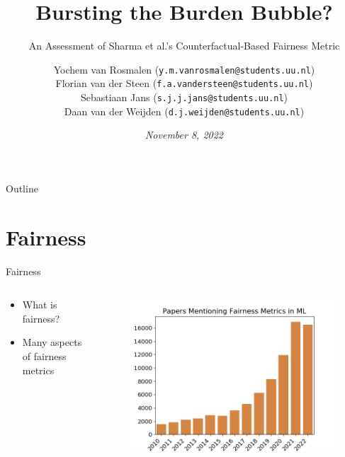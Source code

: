 \documentclass[handout,aspectratio=169]{beamer}
\title{Bursting the Burden Bubble?}
\subtitle{An Assessment of Sharma et al.'s Counterfactual-Based Fairness Metric}
\date{\textit{November 8, 2022}}
\author{%
Yochem van Rosmalen {\scriptsize(\texttt{y.m.vanrosmalen@students.uu.nl})}\\
Florian van der Steen {\scriptsize(\texttt{f.a.vandersteen@students.uu.nl})}\\
Sebastiaan Jans {\scriptsize(\texttt{s.j.j.jans@students.uu.nl})}\\
Daan van der Weijden {\scriptsize(\texttt{d.j.weijden@students.uu.nl})}
}
\institute{Utrecht University, The Netherlands}
\begin{document}
\maketitle

\begin{frame}{Outline}
    \tableofcontents
\end{frame}

\section{Fairness}

\begin{frame}{Fairness}
    \begin{columns}
        \begin{column}{0.5\textwidth}
            \begin{itemize}
            \item What is fairness?
            \item Many aspects of fairness \pause \alert{metrics}
            \end{itemize}
        \end{column}
        \begin{column}{0.5\textwidth}
            \begin{figure}
                \centering
                \includegraphics[width=\textwidth]{img/fairness.png}
                \label{fig:fairnessmetrics}
            \end{figure}
        \end{column}
    \end{columns}
\end{frame}
\end{document}
